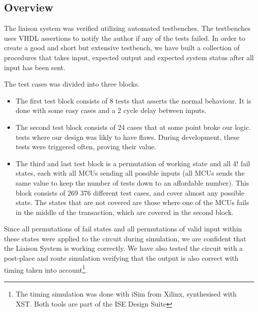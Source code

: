 \subsection{Overview}
The liaison system was verified utilizing automated testbenches. The testbenches uses VHDL assertions to notify the author if any
of the tests failed. In order to create a good and short but extensive testbench, we have built a collection of procedures that takes input, expected output
and expected system status after all input has been sent.

The test cases was divided into three blocks.
\begin{itemize}
\item The first test block consists of 8 tests that asserts the normal behaviour. It is done with some easy cases and a 2 cycle delay between inputs.

\item The second test block consists of 24 cases that at some point broke our logic.  tests where our design was likly to have flaws. During development, these tests were
triggered often, proving their value.

\item The third and last test block is a permutation of working state and all 4! fail states, each with all MCUs sending
all possible inputs (all MCUs sends the same value to keep the number of tests down to an affordable number). This block consists of 269 376 different test cases,
and cover almost any possible state. The states that are not covered are those where one of the MCUs fails in the middle of the transaction, which are covered in
the second block.
\end{itemize}

Since all permutations of fail states and all permutations of valid input within these states
were applied to the circuit during simulation, we are confident that the Liaison System is working correctly. We have also tested the circuit with a post-place and route
simulation verifying that the output is also correct with timing taken into account\footnote{The timing simulation was done with iSim from Xilinx, synthesised with XST. Both tools are part of the ISE Design Suite}.

